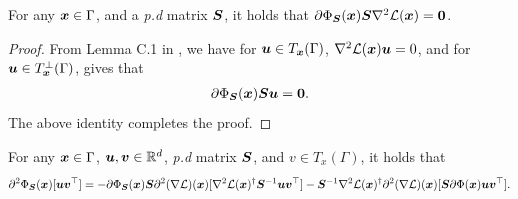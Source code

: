 \begin{lemma}\label{lmm:phi-H-0}
    For any ${\bm{x}}\in\Gamma$, and a \textit{p.d} matrix ${\bm{S}}$, it holds that $\partial \Phi_{{\bm{S}}}({\bm{x}}) {\bm{S}} \nabla^2 \mathcal{L}({\bm{x}})=\boldsymbol{0}$.
\end{lemma}
\begin{proof}
    From Lemma C.1 in \citet{li2021happens}, we have for ${\bm{u}}\in T_{{\bm{x}}}(\Gamma)$, $\nabla^2 \mathcal{L}({\bm{x}}){\bm{u}}=0$, and for ${\bm{u}}\in T_{{\bm{x}}}^{\perp}(\Gamma)$,  gives that
    \begin{align*}
        \partial \Phi_{{\bm{S}}}({\bm{x}}){\bm{S}} {\bm{u}} = \boldsymbol{0}.
    \end{align*}
    The above identity completes the proof.
\end{proof}
\begin{lemma}\label{lmm:phi-nabla-L}
    For any ${\bm{x}}\in\Gamma$, ${\bm{u}},{\bm{v}}\in \mathbb{R}^d$, \textit{p.d} matrix ${\bm{S}}$, and $v\in T_{x}(\Gamma)$, it holds that
    \begin{align*}
        \partial^2 \Phi_{{\bm{S}}}({\bm{x}})[{\bm{u}}{\bm{v}}^\top] = -\partial \Phi_{{\bm{S}}}({\bm{x}}){\bm{S}} \partial^2(\nabla \mathcal{L})({\bm{x}})[\nabla^2 \mathcal{L}({\bm{x}})^{\dagger}{\bm{S}}^{-1}{\bm{u}}{\bm{v}}^\top] - {\bm{S}}^{-1} \nabla^2 \mathcal{L}({\bm{x}})^{\dagger}\partial^2(\nabla \mathcal{L})({\bm{x}})[{\bm{S}} \partial \Phi({\bm{x}}){\bm{u}}{\bm{v}}^\top].
    \end{align*}
\end{lemma}
